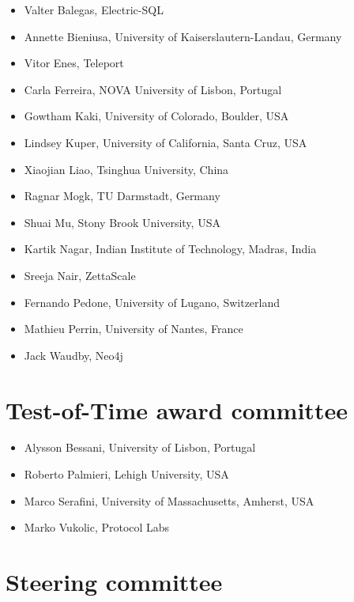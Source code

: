 \documentclass[acmsmall,nonacm]{acmart}
\begin{document}
\begin{itemize}
\item Valter Balegas, Electric-SQL
\item Annette Bieniusa, University of Kaiserslautern-Landau, Germany
\item Vitor Enes, Teleport
\item Carla Ferreira, NOVA University of Lisbon, Portugal
\item Gowtham Kaki, University of Colorado, Boulder, USA
\item Lindsey Kuper, University of California, Santa Cruz, USA
\item Xiaojian Liao, Tsinghua University, China
\item Ragnar Mogk, TU Darmstadt, Germany
\item Shuai Mu, Stony Brook University, USA
\item Kartik Nagar, Indian Institute of Technology, Madras, India
\item Sreeja Nair, ZettaScale
\item Fernando Pedone, University of Lugano, Switzerland
\item Mathieu Perrin, University of Nantes, France
\item Jack Waudby, Neo4j
\end{itemize}

\section*{Test-of-Time award committee}

\begin{itemize}
\item Alysson Bessani, University of Lisbon, Portugal
\item Roberto Palmieri, Lehigh University, USA
\item Marco Serafini, University of Massachusetts, Amherst, USA
\item Marko Vukolic, Protocol Labs
\end{itemize}

\section*{Steering committee}
\end{document}

